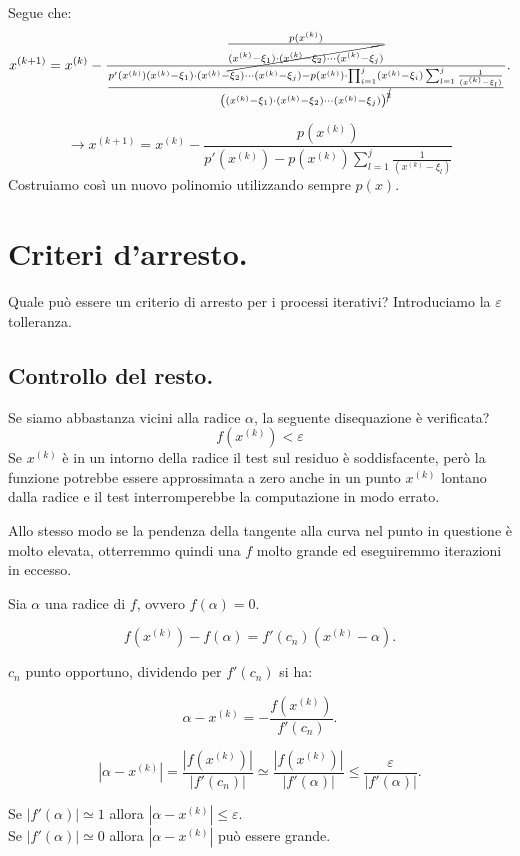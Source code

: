 Segue che:
\[
x^{(k+1)} = x^{(k)} - \frac{\frac{p(x^{(k)})}{\cancel{(x^{(k)}-\xi_1)\cdot(x^{(k)}
-\xi_2)\cdots (x^{(k)}-\xi_j)}}}{\frac{p'(x^{(k)})(x^{(k)}-\xi_1)\cdot(x^{(k)}-
\xi_2)\cdots (x^{(k)}-\xi_j) - p(x^{(k)})\cdot\prod_{i = 1}^j (x^{(k)}-\xi_i)  
\sum_{l=1}^j\frac{1}{(x^{(k)} - \xi_l)}}{\left((x^{(k)}-\xi_1)\cdot(x^{(k)}-\xi_2)
\cdots (x^{(k)}-\xi_j)\right)^{\cancel{2}}}}.
\]

\[\longrightarrow
x^{(k+1)} = x^{(k)} - \frac{p(x^{(k)})}{p'(x^{(k)})- p(x^{(k)})\sum_{l=1}^j
\frac{1}{(x^{(k)} - \xi_l)}}
\]
Costruiamo così un nuovo polinomio utilizzando sempre $p(x)$.

\section{Criteri d'arresto.}
Quale può essere un criterio di arresto per i processi iterativi?
Introduciamo la $\varepsilon$ tolleranza.

\subsection{Controllo del resto.}
Se siamo abbastanza vicini alla radice $\alpha$, la seguente disequazione è
verificata?
\[f\left(x^{(k)}\right) < \varepsilon\]
Se $x^{(k)}$ è in un intorno della radice il test sul residuo è soddisfacente,
però la funzione potrebbe essere approssimata a zero anche in un punto
$x^{(k)}$ lontano dalla radice e il test interromperebbe la computazione
in modo errato.

Allo stesso modo se la pendenza della tangente alla curva nel punto in 
questione è molto elevata, otterremmo quindi una $f$ molto grande ed 
eseguiremmo iterazioni in eccesso.

Sia $\alpha$ una radice di $f$, ovvero $f(\alpha) = 0$.

\[f\left(x^{(k)}\right) - f(\alpha) = f'(c_n)\left(x^{(k)}-\alpha\right).\]

$c_n$ punto opportuno, dividendo per $f'(c_n)$ si ha:

\[
\alpha - x^{(k)} = - \frac{f\left(x^{(k)}\right)}{f'(c_n)}.
\]

\[
|\alpha - x^{(k)}| = \frac{|f\left(x^{(k)}\right)|}{|f'(c_n)|}
\simeq \frac{|f\left(x^{(k)}\right)|}{|f'(\alpha)|} \leq \frac{\varepsilon}
{|f'(\alpha)|}.
\]

Se $|f'(\alpha)| \simeq 1$ allora $|\alpha - x^{(k)}| \leq \varepsilon$.\\

Se $|f'(\alpha)| \simeq 0$ allora $|\alpha - x^{(k)}|$ può essere grande.

